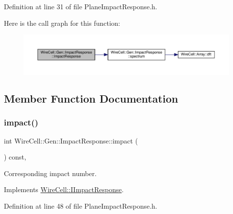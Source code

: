Definition at line 31 of file Plane\+Impact\+Response.\+h.

Here is the call graph for this function\+:
\nopagebreak
\begin{figure}[H]
\begin{center}
\leavevmode
\includegraphics[width=350pt]{class_wire_cell_1_1_gen_1_1_impact_response_ad10810e7b4dfbc2ab17cd79ff3b962f5_cgraph}
\end{center}
\end{figure}


\subsection{Member Function Documentation}
\mbox{\label{class_wire_cell_1_1_gen_1_1_impact_response_a664b5b110cc63973d357bcf9c9f155d8}} 
\subsubsection{\texorpdfstring{impact()}{impact()}}
{\footnotesize\ttfamily int Wire\+Cell\+::\+Gen\+::\+Impact\+Response\+::impact (\begin{DoxyParamCaption}{ }\end{DoxyParamCaption}) const\hspace{0.3cm}{\ttfamily [inline]}, {\ttfamily [virtual]}}



Corresponding impact number. 



Implements \hyperlink{class_wire_cell_1_1_i_impact_response_a13026bcae5d6d06701752f96a9544c5d}{Wire\+Cell\+::\+I\+Impact\+Response}.



Definition at line 48 of file Plane\+Impact\+Response.\+h.

\mbox{\label{class_wire_cell_1_1_gen_1_1_impact_response_a8d8bd238c6286a8e6c70dc7a543a5ca3}} 
